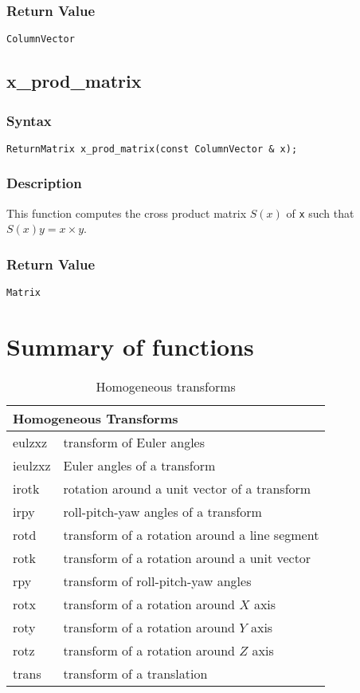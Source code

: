 \documentclass[dvips,11pt,fleqn]{report}
\begin{document}
\subsubsection*{Return Value}

{\tt ColumnVector}

\newpage

\subsection*{x\_prod\_matrix}
\subsubsection*{Syntax}
\begin{verbatim}
ReturnMatrix x_prod_matrix(const ColumnVector & x);
\end{verbatim}
\subsubsection*{Description}
This function computes the cross product matrix $S(x)$ of {\tt x} such
that $S(x)y = x \times y$.

\subsubsection*{Return Value}

{\tt Matrix}
\newpage

\section{Summary of functions}

\begin{table}[htbp]
\caption{Homogeneous transforms}
\label{tab:commandsum1}
\begin{center}
\begin{tabular}{||l|l||}
\hline
\hline
\multicolumn{2}{||l||}{{\bf Homogeneous Transforms}} \\
\hline
\hline
eulzxz & transform of Euler angles \\
\hline
ieulzxz & Euler angles of a transform \\
\hline
irotk & rotation around a unit vector of a transform \\
\hline
irpy & roll-pitch-yaw angles of a transform \\
\hline
rotd & transform of a rotation around a line segment \\
\hline
rotk & transform of a rotation around a unit vector \\
\hline
rpy & transform of roll-pitch-yaw angles \\
\hline
rotx & transform of a rotation around $X$ axis \\
\hline
roty & transform of a rotation around $Y$ axis \\
\hline
rotz & transform of a rotation around $Z$ axis \\
\hline
trans & transform of a translation \\
\hline
\hline
\end{tabular}
\end{center}
\end{table}
\end{document}
